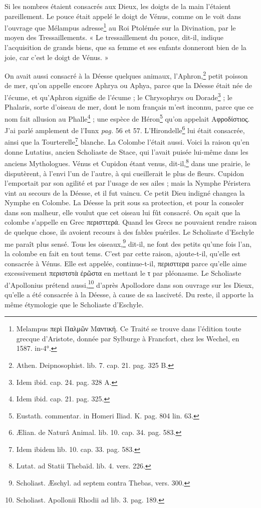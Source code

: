\documentclass[a4paper, 18pt, oneside]{article}
\begin{document}
Si les nombres étaient consacrés aux Dieux, les doigts de la main l'étaient pareillement. Le pouce était appelé le doigt de Vénus, comme on le voit dans l'ouvrage que Mélampus adresse\footnote{Melampus περὶ Παλμῶν Μαντική. Ce Traité se trouve dans l'édition toute grecque d'Aristote, donnée par Sylburge à Francfort, chez les Wechel, en 1587. in-4°.} au Roi Ptolémée sur la Divination, par le moyen des Tressaillements. « Le tressaillement du pouce, dit-il, indique l'acquisition de grands biens, que sa femme et ses enfants donneront bien de la joie, car c'est le doigt de Vénus. »

On avait aussi consacré à la Déesse quelques animaux, l'Aphron,\footnote{Athen. Deipnosophist. lib. 7. cap. 21. pag. 325 B.} petit poisson de mer, qu'on appelle encore Aphrya ou Aphya, parce que la Déesse était née de l'écume, et qu'Aphron signifie de l'écume ; le Chrysophrys ou Dorade\footnote{Idem ibid. cap. 24. pag. 328 A.} ; le Phalaris, sorte d'oiseau de mer, dont le nom français m'est inconnu, parce que ce nom fait allusion au Phalle\footnote{Idem ibid. cap. 21. pag. 325.} ; une espèce de Héron\footnote{Eustath. commentar. in Homeri Iliad. K. pag. 804 lin. 63.} qu'on appelait Αφροδίστιος. J'ai parlé amplement de l'Iunx \emph{pag.} 56 et 57. L'Hirondelle\footnote{Ælian. de Naturâ Animal. lib. 10. cap. 34. pag. 583.} lui était consacrée, ainsi que la Tourterelle\footnote{Idem ibidem lib. 10. cap. 33. pag. 583.} blanche. La Colombe l'était aussi. Voici la raison qu'en donne Lutatius, ancien Scholiaste de Stace, qui l'avait puisée lui-même dans les anciens Mythologues. Vénus et Cupidon étant venus, dit-il,\footnote{Lutat. ad Statii Thebaïd. lib. 4. vers. 226.} dans une prairie, le disputèrent, à l'envi l'un de l'autre, à qui cueillerait le plus de fleurs. Cupidon l'emportait par son agilité et par l'usage de ses ailes ; mais la Nymphe Péristera vint au secours de la Déesse, et il fut vaincu. Ce petit Dieu indigné changea la Nymphe en Colombe. La Déesse la prit sous sa protection, et pour la consoler dans son malheur, elle voulut que cet oiseau lui fût consacré. On sçait que la colombe s'appelle en Grec περισττερά. Quand les Grecs ne pouvaient rendre raison de quelque chose, ils avoient recours à des fables puériles. Le Scholiaste d'Eschyle me paraît plus sensé. Tous les oiseaux,\footnote{Scholiast. Æschyl. ad septem contra Thebas, vers. 300.} dit-il, ne font des petits qu'une fois l'an, la colombe en fait en tout tems. C'est par cette raison, ajoute-t-il, qu'elle est consacrée à Vénus. Elle est appelée, continue-t-il, περισττερα parce qu'elle aime excessivement περιστστὰ ἐρῶστα en mettant le τ par pléonasme. Le Scholiaste d'Apollonius prétend aussi,\footnote{Scholiast. Apollonii Rhodii ad lib. 3. pag. 189.} d'après Apollodore dans son ouvrage sur les Dieux, qu'elle a été consacrée à la Déesse, à cause de sa lasciveté. Du reste, il apporte la même étymologie que le Scholiaste d'Eschyle.
\end{document}
